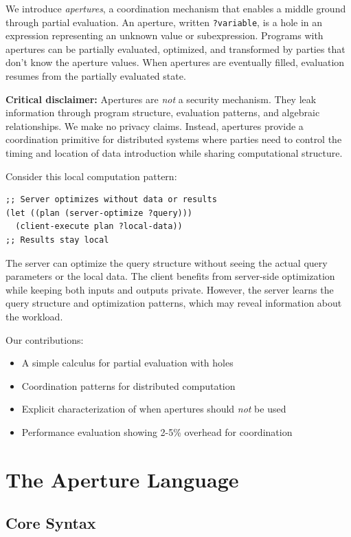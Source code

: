\documentclass[10pt]{article}
\begin{document}
We introduce \textit{apertures}, a coordination mechanism that enables a middle ground through partial evaluation. An aperture, written \texttt{?variable}, is a hole in an expression representing an unknown value or subexpression. Programs with apertures can be partially evaluated, optimized, and transformed by parties that don't know the aperture values. When apertures are eventually filled, evaluation resumes from the partially evaluated state.

\textbf{Critical disclaimer:} Apertures are \textit{not} a security mechanism. They leak information through program structure, evaluation patterns, and algebraic relationships. We make no privacy claims. Instead, apertures provide a coordination primitive for distributed systems where parties need to control the timing and location of data introduction while sharing computational structure.

Consider this local computation pattern:
\begin{lstlisting}
;; Server optimizes without data or results
(let ((plan (server-optimize ?query)))
  (client-execute plan ?local-data))
;; Results stay local
\end{lstlisting}

The server can optimize the query structure without seeing the actual query parameters or the local data. The client benefits from server-side optimization while keeping both inputs and outputs private. However, the server learns the query structure and optimization patterns, which may reveal information about the workload.

Our contributions:
\begin{itemize}
\item A simple calculus for partial evaluation with holes
\item Coordination patterns for distributed computation
\item Explicit characterization of when apertures should \textit{not} be used
\item Performance evaluation showing 2-5\% overhead for coordination
\end{itemize}

\section{The Aperture Language}

\subsection{Core Syntax}
\end{document}
